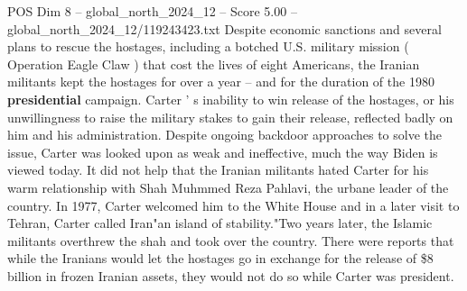 \begin{textsample}{POS Dim 8 – global\_north\_2024\_12 – Score 5.00 – global\_north\_2024\_12/119243423.txt}
Despite economic sanctions and several plans to rescue the hostages, including a botched U.S. military mission ( Operation Eagle Claw ) that cost the lives of eight Americans, the Iranian militants kept the hostages for over a year -- and for the duration of the 1980 \textbf{presidential} campaign.
Carter ' s inability to win release of the hostages, or his unwillingness to raise the military stakes to gain their release, reflected badly on him and his administration.
Despite ongoing backdoor approaches to solve the issue, Carter was looked upon as weak and ineffective, much the way Biden is viewed today.
It did not help that the Iranian militants hated Carter for his warm relationship with Shah Muhmmed Reza Pahlavi, the urbane leader of the country.
In 1977, Carter welcomed him to the White House and in a later visit to Tehran, Carter called Iran"an island of stability."Two years later, the Islamic militants overthrew the shah and took over the country.
There were reports that while the Iranians would let the hostages go in exchange for the release of \$8 billion in frozen Iranian assets, they would not do so while Carter was president.

\end{textsample}
